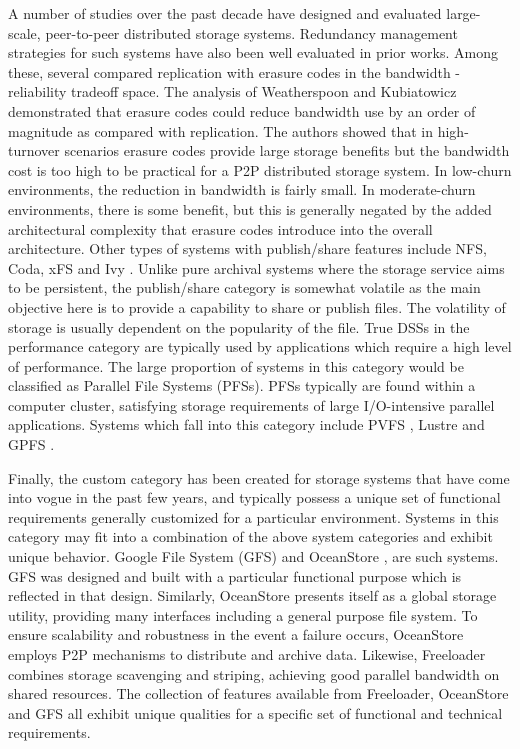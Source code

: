 \documentclass[11pt]{article}
\begin{document}
A number of studies over the past decade have designed and evaluated
large- scale, peer-to-peer distributed storage systems. Redundancy
management strategies for such systems have also been well evaluated
in prior works.  Among these, several compared replication with
erasure codes in the bandwidth -reliability tradeoff space. The
analysis of Weatherspoon and Kubiatowicz demonstrated that erasure
codes could reduce bandwidth use by an order of magnitude as compared
with replication. The authors showed that in high- turnover scenarios
erasure codes provide large storage benefits but the bandwidth cost is
too high to be practical for a P2P distributed storage system. In
low-churn environments, the reduction in bandwidth is fairly small. In
moderate-churn environments, there is some benefit, but this is
generally negated by the added architectural complexity that erasure
codes introduce into the overall architecture. Other types of systems
with publish/share features include NFS, Coda, xFS and Ivy
\cite{Muthitacharoen:2002}. Unlike pure archival systems where the
storage service aims to be persistent, the publish/share category is
somewhat volatile as the main objective here is to provide a
capability to share or publish files. The volatility of storage is
usually dependent on the popularity of the file. True DSSs in the
performance category are typically used by applications which require
a high level of performance. The large proportion of systems in this
category would be classified as Parallel File Systems (PFSs).  PFSs
typically are found within a computer cluster, satisfying storage
requirements of large I/O-intensive parallel applications.  Systems
which fall into this category include PVFS \cite{Carns:2002}, Lustre
\cite{Braam:LustreWhite} and GPFS \cite{Schmuck:2002}.

Finally, the custom category has been created for storage systems that
have come into vogue in the past few years, and typically possess a
unique set of functional requirements generally customized for a
particular environment.  Systems in this category may fit into a
combination of the above system categories and exhibit unique
behavior. Google File System (GFS) \cite{Ghemawat:2003p1274} and
OceanStore \cite{Kubiatowicz:2000,Rhea:2003}, are such
systems. GFS was designed and built with a particular functional
purpose which is reflected in that design. Similarly, OceanStore
presents itself as a global storage utility, providing many interfaces
including a general purpose file system. To ensure scalability and
robustness in the event a failure occurs, OceanStore employs P2P
mechanisms to distribute and archive data. Likewise, Freeloader
\cite{Vazhkudai:2005} combines storage scavenging and striping,
achieving good parallel bandwidth on shared resources. The collection
of features available from Freeloader, OceanStore and GFS all exhibit
unique qualities for a specific set of functional and technical
requirements.
\end{document}
